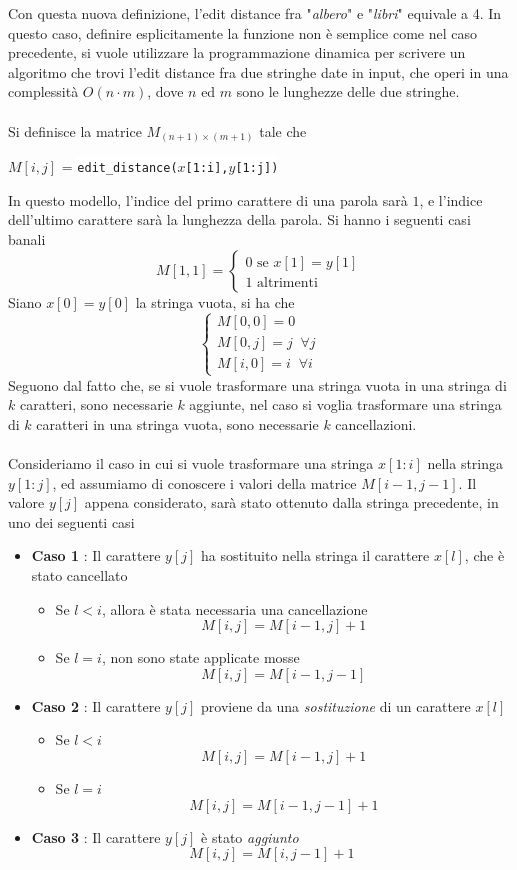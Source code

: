 \documentclass[12pt, letterpaper]{article}
\newcommand{\codee}[1]{\colorbox{white}{\texttt{#1}}}
\newcommand{\acc}{\\\hphantom{}\\}
\begin{document}
Con questa nuova definizione, l'edit distance fra  "\textit{albero}" e "\textit{libri}" equivale a 4. In questo caso, definire 
esplicitamente la funzione non è semplice come nel caso precedente, si vuole utilizzare la programmazione dinamica per 
scrivere un algoritmo che trovi l'edit distance fra due stringhe date in input, che operi in una complessità $O(n\cdot m)$, 
dove $n$ ed $m$ sono le lunghezze delle due stringhe.\acc 
Si definisce la matrice $M_{(n+1)\times (m+1)}$ tale che \begin{center}
    $M[i,j]$ = \codee{edit\_distance($x$[1:i],$y$[1:j])}
\end{center}
In questo modello, l'indice del primo carattere di una parola sarà $1$, e l'indice 
dell'ultimo carattere sarà la lunghezza della parola. Si hanno i seguenti casi banali 
$$M[1,1]=\begin{cases}
    0\text{ se }x[1]=y[1]\\ 
    1 \text{ altrimenti}
\end{cases} $$
Siano $x[0]=y[0]$ la stringa vuota, si ha che$$\begin{cases} M[0,0]=0\\M[0,j]=j\;\;\forall j\\M[i,0]=i\;\;\forall i\end{cases} $$
Seguono dal fatto che, se si vuole trasformare una stringa vuota in una stringa di $k$ caratteri, sono necessarie 
$k$ aggiunte, nel caso si voglia trasformare una stringa di $k$ caratteri in una stringa vuota, sono 
necessarie $k$ cancellazioni.\acc 
Consideriamo il caso in cui si vuole trasformare una stringa $x[1:i]$ nella stringa $y[1:j]$, ed assumiamo di conoscere i 
valori della matrice $M[i-1,j-1]$. Il valore $y[j]$ appena considerato, sarà stato ottenuto dalla stringa precedente, in 
uno dei seguenti casi\begin{itemize}
    \item \textbf{Caso 1} : Il carattere $y[j]$ ha sostituito nella stringa il carattere $x[l]$, che è stato cancellato\begin{itemize}
        \item Se $l<i$, allora è stata necessaria una cancellazione $$ M[i,j]=M[i-1,j]+1$$ 
        \item Se $l=i$, non sono state applicate mosse $$M[i,j]=M[i-1,j-1] $$
    \end{itemize}
    \item \textbf{Caso 2} : Il carattere $y[j]$ proviene da una \textit{sostituzione} di un carattere $x[l]$\begin{itemize}
        \item Se $l<i$ $$ M[i,j]=M[i-1,j]+1$$ 
        \item Se $l=i$ $$ M[i,j]=M[i-1,j-1]+1$$
    \end{itemize} 
    \item  \textbf{Caso 3} :   Il carattere $y[j]$ è stato \textit{aggiunto} $$ M[i,j]=M[i,j-1]+1$$
\end{itemize}
\end{document}
